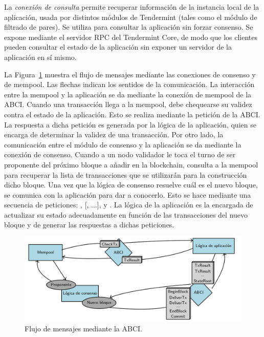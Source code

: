%

La \textit{conexión de consulta} permite recuperar información de la instancia local de la aplicación, usada
por distintos módulos de Tendermint (tales como el módulo de filtrado de pares).
%
Se utiliza para consultar la aplicación sin forzar consenso.
%
Se expone mediante el servidor RPC del Tendermint Core, de modo que los clientes pueden
consultar el estado de la aplicación sin exponer un servidor de la aplicación en sí mismo. 

La Figura~\ref{fig:abci_flow} muestra el flujo de mensajes mediante las conexiones de consenso y de mempool.
%
Las flechas indican los sentidos de la comunicación.
%
La interacción entre la mempool y la aplicación se da mediante la conexión de mempool de la ABCI.
%
Cuando una transacción llega a la mempool, debe chequearse su validez contra el estado de la aplicación.
%
Esto se realiza mediante la petición \CheckTx de la ABCI.
%
La respuesta a dicha petición es generada por la lógica de la aplicación, quien se encarga de determinar la
validez de una transacción.
%
Por otro lado, la comunicación entre el módulo de consenso y la aplicación se da mediante la conexión de consenso.
%
Cuando a un nodo validador le toca el turno de ser proponente del próximo bloque a añadir en la blockchain,
consulta a la mempool para recuperar la lista de transacciones que se utilizarán para la construcción dicho bloque.
%
Una vez que la lógica de consenso resuelve cuál es el nuevo bloque, se comunica con la aplicación para
dar a conocerlo.
%
Esto se hace mediante una secuencia de peticiones: \BeginBlock, [\DeliverTx, ...], \EndBlock y \Commit.
%
La lógica de la aplicación es la encargada de actualizar su estado adecuadamente en función de las transacciones del
nuevo bloque y de generar las respuestas a dichas peticiones.


\begin{figure}
  \centering
  \includegraphics[scale=0.35]{figures/abci_msg_flow.png}
  \caption{Flujo de mensajes mediante la ABCI.}
  \label{fig:abci_flow}
\end{figure}


